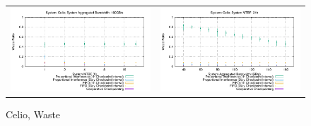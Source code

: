 \documentclass[conference]{IEEEtran}
\begin{document}
\begin{figure}[t]
\begin{tabular}{C{.5\linewidth}C{.5\linewidth}}
\includegraphics[width=\linewidth]{sim/figures/synthetic-160gbs-waste-celio.pdf} & \includegraphics[width=\linewidth]{sim/figures/synthetic-24hMTBF-waste-celio.pdf} \\
\end{tabular}
\caption{Celio, Waste}
\end{figure}

\clearpage
\end{document}
